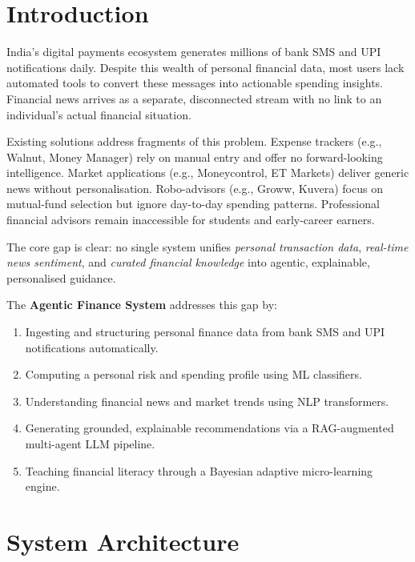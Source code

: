 \documentclass[conference]{IEEEtran}
\begin{document}
\section{Introduction}

India's digital payments ecosystem generates millions of bank SMS and UPI notifications daily. Despite this wealth of personal financial data, most users lack automated tools to convert these messages into actionable spending insights. Financial news arrives as a separate, disconnected stream with no link to an individual's actual financial situation.

Existing solutions address fragments of this problem. Expense trackers (e.g., Walnut, Money Manager) rely on manual entry and offer no forward-looking intelligence. Market applications (e.g., Moneycontrol, ET Markets) deliver generic news without personalisation. Robo-advisors (e.g., Groww, Kuvera) focus on mutual-fund selection but ignore day-to-day spending patterns. Professional financial advisors remain inaccessible for students and early-career earners.

The core gap is clear: no single system unifies \emph{personal transaction data}, \emph{real-time news sentiment}, and \emph{curated financial knowledge} into agentic, explainable, personalised guidance.

The \textbf{Agentic Finance System} addresses this gap by:
\begin{enumerate}
  \item Ingesting and structuring personal finance data from bank SMS and UPI notifications automatically.
  \item Computing a personal risk and spending profile using ML classifiers.
  \item Understanding financial news and market trends using NLP transformers.
  \item Generating grounded, explainable recommendations via a RAG-augmented multi-agent LLM pipeline.
  \item Teaching financial literacy through a Bayesian adaptive micro-learning engine.
\end{enumerate}

\section{System Architecture}
\end{document}
